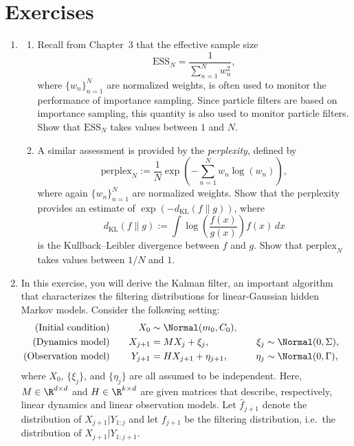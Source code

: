 
\section{Exercises}
\label{sec:9.5}

\begin{enumerate}

\item[9.1]
\begin{enumerate}[label=\alph*)]
  \item Recall from Chapter~3 that the effective sample size
    \[
      \mathrm{ESS}_N = \frac{1}{\displaystyle\sum_{n=1}^{N} w_n^2},
    \]
    where $\{w_n\}_{n=1}^{N}$ are normalized weights, is often used to monitor the
    performance of importance sampling. Since particle filters are based on importance
    sampling, this quantity is also used to monitor particle filters. Show that
    $\mathrm{ESS}_N$ takes values between $1$ and $N$.

  \item A similar assessment is provided by the \emph{perplexity}, defined by
    \[
      \mathrm{perplex}_N := \frac{1}{N}\exp\!\left(-\sum_{n=1}^{N} w_n \log(w_n)\right),
    \]
    where again $\{w_n\}_{n=1}^{N}$ are normalized weights. Show that the perplexity
    provides an estimate of $\exp\!\left(-d_{\mathrm{KL}}(f \| g)\right)$, where
    \[
      d_{\mathrm{KL}}(f \| g) := \int \log\!\left(\frac{f(x)}{g(x)}\right) f(x)\,dx
    \]
    is the Kullback--Leibler divergence between $f$ and $g$. Show that
    $\mathrm{perplex}_N$ takes values between $1/N$ and $1$.
\end{enumerate}

\item[9.2] In this exercise, you will derive the Kalman filter, an important algorithm
that characterizes the filtering distributions for linear-Gaussian hidden Markov models.
Consider the following setting:
\begin{alignat*}{3}
  \text{(Initial condition)}  &\quad& X_0 &\sim \Normal(m_0, C_0), \\
  \text{(Dynamics model)}     &\quad& X_{j+1} &= MX_j + \xi_j, &\quad
    \xi_j &\sim \Normal(0, \Sigma), \\
  \text{(Observation model)}  &\quad& Y_{j+1} &= HX_{j+1} + \eta_{j+1}, &\quad
    \eta_j &\sim \Normal(0, \Gamma),
\end{alignat*}
where $X_0$, $\{\xi_j\}$, and $\{\eta_j\}$ are all assumed to be independent. Here,
$M \in \R^{d \times d}$ and $H \in \R^{k \times d}$ are given matrices that describe,
respectively, linear dynamics and linear observation models. Let $\widehat{f}_{j+1}$
denote the distribution of $X_{j+1} | Y_{1:j}$ and let $f_{j+1}$ be the filtering
distribution, i.e.\ the distribution of $X_{j+1} | Y_{1:j+1}$.


\end{enumerate}

